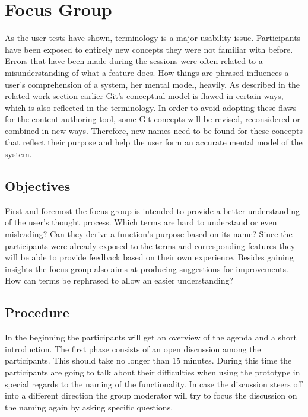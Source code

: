 \chapter{Focus Group} \label{chapter:focus-group}
As the user tests have shown, terminology is a major usability issue. Participants have been exposed to entirely new concepts they were not familiar with before. Errors that have been made during the sessions were often related to a misunderstanding of what a feature does. How things are phrased influences a user’s comprehension of a system, her mental model, heavily. As described in the related work section earlier Git’s conceptual model is flawed in certain ways, which is also reflected in the terminology. In order to avoid adopting these flaws for the content authoring tool, some Git concepts will be revised, reconsidered or combined in new ways. Therefore, new names need to be found for these concepts that reflect their purpose and help the user form an accurate mental model of the system.

\section{Objectives}
First and foremost the focus group is intended to provide a better understanding of the user’s thought process. Which terms are hard to understand or even misleading? Can they derive a function’s purpose based on its name? Since the participants were already exposed to the terms and corresponding features they will be able to provide feedback based on their own experience. Besides gaining insights the focus group also aims at producing suggestions for improvements. How can terms be rephrased to allow an easier understanding?

\section{Procedure}
In the beginning the participants will get an overview of the agenda and a short introduction. The first phase consists of an open discussion among the participants. This should take no longer than 15 minutes. During this time the participants are going to talk about their difficulties when using the prototype in special regards to the naming of the functionality. In case the discussion steers off into a different direction the group moderator will try to focus the discussion on the naming again by asking specific questions.

